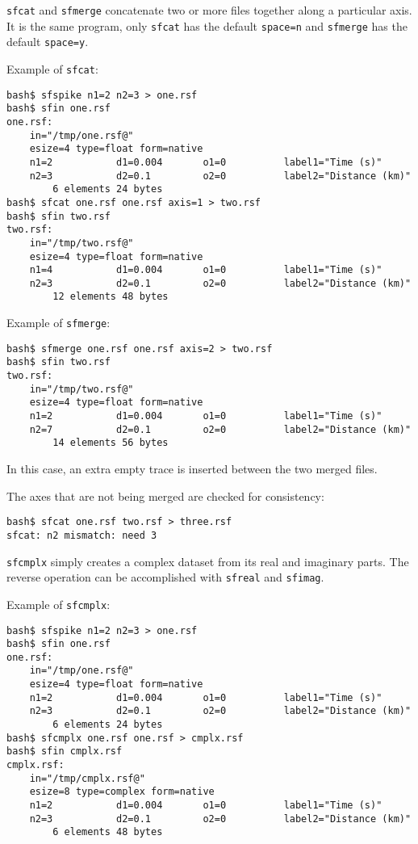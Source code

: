 \noindent\doublebox{\parbox{\textwidth}{

}}

\texttt{sfcat} and \texttt{sfmerge} concatenate two or more files
together along a particular axis. It is the same program, only
\texttt{sfcat} has the default \texttt{space=n} and \texttt{sfmerge}
has the default \texttt{space=y}.

Example of \texttt{sfcat}:
\begin{verbatim}
bash$ sfspike n1=2 n2=3 > one.rsf
bash$ sfin one.rsf
one.rsf:
    in="/tmp/one.rsf@"
    esize=4 type=float form=native
    n1=2           d1=0.004       o1=0          label1="Time (s)"
    n2=3           d2=0.1         o2=0          label2="Distance (km)"
        6 elements 24 bytes
bash$ sfcat one.rsf one.rsf axis=1 > two.rsf
bash$ sfin two.rsf
two.rsf:
    in="/tmp/two.rsf@"
    esize=4 type=float form=native
    n1=4           d1=0.004       o1=0          label1="Time (s)"
    n2=3           d2=0.1         o2=0          label2="Distance (km)"
        12 elements 48 bytes
\end{verbatim}

Example of \texttt{sfmerge}:
\begin{verbatim}
bash$ sfmerge one.rsf one.rsf axis=2 > two.rsf
bash$ sfin two.rsf
two.rsf:
    in="/tmp/two.rsf@"
    esize=4 type=float form=native
    n1=2           d1=0.004       o1=0          label1="Time (s)"
    n2=7           d2=0.1         o2=0          label2="Distance (km)"
        14 elements 56 bytes
\end{verbatim}
In this case, an extra empty trace is inserted between the two merged files.

The axes that are not being merged are checked for consistency:
\begin{verbatim}
bash$ sfcat one.rsf two.rsf > three.rsf
sfcat: n2 mismatch: need 3
\end{verbatim}

\noindent\doublebox{\parbox{\textwidth}{

}}

\texttt{sfcmplx} simply creates a complex dataset from its real and
imaginary parts. The reverse operation can be accomplished with
\texttt{sfreal} and \texttt{sfimag}.

Example of \texttt{sfcmplx}:
\begin{verbatim}
bash$ sfspike n1=2 n2=3 > one.rsf
bash$ sfin one.rsf
one.rsf:
    in="/tmp/one.rsf@"
    esize=4 type=float form=native
    n1=2           d1=0.004       o1=0          label1="Time (s)"
    n2=3           d2=0.1         o2=0          label2="Distance (km)"
        6 elements 24 bytes
bash$ sfcmplx one.rsf one.rsf > cmplx.rsf
bash$ sfin cmplx.rsf
cmplx.rsf:
    in="/tmp/cmplx.rsf@"
    esize=8 type=complex form=native
    n1=2           d1=0.004       o1=0          label1="Time (s)"
    n2=3           d2=0.1         o2=0          label2="Distance (km)"
        6 elements 48 bytes
\end{verbatim}

